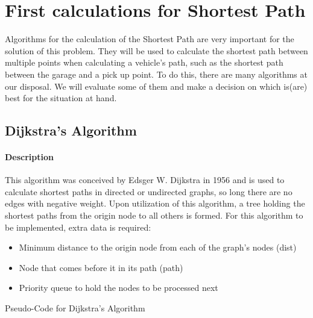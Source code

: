 \section{First calculations for Shortest Path}

Algorithms for the calculation of the Shortest Path are very important for the solution of this problem. They will be used to calculate the shortest path between multiple points when calculating a vehicle's path, such as the shortest path between the garage and a pick up point. To do this, there are many algorithms at our disposal. We will evaluate some of them and make a decision on which is(are) best for the situation at hand.

\subsection{Dijkstra's Algorithm}
\paragraph{Description}
This algorithm was conceived by Edsger W. Dijkstra in 1956 and is used to calculate shortest paths in directed or undirected graphs, so long there are no edges with negative weight. Upon utilization of this algorithm, a tree holding the shortest paths from the origin node to all others is formed. For this algorithm to be implemented, extra data is required:
\begin{itemize}
    \item Minimum distance to the origin node from each of the graph's nodes (dist)
    \item Node that comes before it in its path (path)
    \item Priority queue to hold the nodes to be processed next
\end{itemize}
\begin{algorithm}[H]
    \caption{Pseudo-Code for Dijkstra's Algorithm}
    \begin{algorithmic}[1]
            \ENDFOR
             
              
                 
                 
                        \ENDIF
                        \ELSE
                             
                    \ENDIF
                \ENDFOR
            \ENDWHILE
        \EndFunction
    \end{algorithmic}
\end{algorithm}
